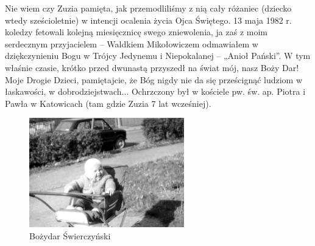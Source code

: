 Nie wiem czy Zuzia pamięta, jak przemodliliśmy z nią cały różaniec (dziecko wtedy sześcioletnie) w intencji ocalenia życia Ojca Świętego. 13 maja 1982 r. koledzy fetowali kolejną miesięcznicę swego zniewolenia, ja zaś z moim serdecznym przyjacielem – Waldkiem Mikołowiczem odmawiałem w dziękczynieniu Bogu w Trójcy Jedynemu i Niepokalanej – „Anioł Pański”. W tym właśnie czasie, krótko przed dwunastą przyszedł na świat mój, nasz Boży Dar! Moje Drogie Dzieci, pamiętajcie, że Bóg nigdy nie da się prześcignąć ludziom w łaskawości, w dobrodziejstwach... Ochrzczony był w kościele pw. św. ap. Piotra i Pawła w Katowicach (tam gdzie Zuzia 7 lat wcześniej).
\begin{figure}[!h]
\begin{center}
\includegraphics[width=0.6\textwidth]{photo/bozydar_swierczynski_1.jpg}
\caption{Bożydar Świerczyński}
\end{center}
\end{figure}

